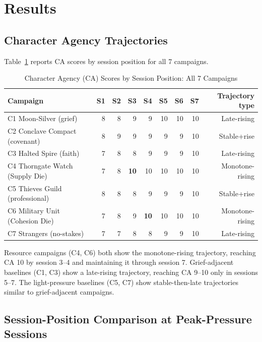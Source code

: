 
\section{Results}
\label{sec:results}

\subsection{Character Agency Trajectories}

Table~\ref{tab:ca-trajectories} reports CA scores by session position for all 7 campaigns.

\begin{table}[t]
\caption{Character Agency (CA) Scores by Session Position: All 7 Campaigns}
\label{tab:ca-trajectories}
\begin{tabular}{@{}lrrrrrrrr@{}}
\toprule
Campaign & S1 & S2 & S3 & S4 & S5 & S6 & S7 & Trajectory type \\
\midrule
C1 Moon-Silver (grief) & 8 & 8 & 9 & 9 & 10 & 10 & 10 & Late-rising \\
C2 Conclave Compact (covenant) & 8 & 9 & 9 & 9 & 9 & 9 & 10 & Stable+rise \\
C3 Halted Spire (faith) & 7 & 8 & 8 & 9 & 9 & 9 & 10 & Late-rising \\
C4 Thorngate Watch (Supply Die) & 7 & 8 & \textbf{10} & 10 & 10 & 10 & 10 & Monotone-rising \\
C5 Thieves Guild (professional) & 8 & 8 & 8 & 9 & 9 & 9 & 10 & Stable+rise \\
C6 Military Unit (Cohesion Die) & 7 & 8 & 9 & \textbf{10} & 10 & 10 & 10 & Monotone-rising \\
C7 Strangers (no-stakes) & 7 & 7 & 8 & 8 & 9 & 9 & 10 & Late-rising \\
\bottomrule
\end{tabular}
\end{table}

Resource campaigns (C4, C6) both show the monotone-rising trajectory, reaching CA 10
by session 3--4 and maintaining it through session 7. Grief-adjacent baselines (C1,
C3) show a late-rising trajectory, reaching CA 9--10 only in sessions 5--7. The
light-pressure baselines (C5, C7) show stable-then-late trajectories similar to
grief-adjacent campaigns.

\subsection{Session-Position Comparison at Peak-Pressure Sessions}

